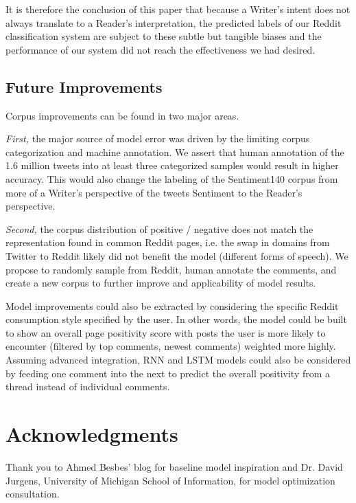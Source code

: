 \documentclass[11pt]{article}
\begin{document}
It is therefore the conclusion of this paper that because a Writer's intent does not always 
translate to a Reader's interpretation, the predicted labels of our Reddit classification 
system are subject to these subtle but tangible biases and the performance of our system 
did not reach the effectiveness we had desired.

\subsection{Future Improvements}

Corpus improvements can be found in two major areas. 

\textit{First,} the major source of model error was driven by the limiting corpus 
categorization and machine annotation. We assert that human annotation of the 1.6 
million tweets into at least three categorized samples would result in higher 
accuracy.  This would also change the labeling of the Sentiment140 corpus from more of 
a Writer's perspective of the tweets Sentiment to the Reader's perspective. 

\textit{Second,} the corpus distribution of positive / negative does not match the 
representation found in common Reddit pages, i.e. the swap in domains from Twitter to 
Reddit likely did not benefit the model (different forms of speech). We propose to 
randomly sample from Reddit, human annotate the comments, and create a new corpus to 
further improve and applicability of model results. 
\linebreak

Model improvements could also be extracted by considering the specific Reddit 
consumption style specified by the user. In other words, the model could be built to 
show an overall page positivity score with posts the user is more likely to encounter 
(filtered by top comments, newest comments) weighted more highly. Assuming advanced 
integration, RNN and LSTM models could also be considered by feeding one comment into 
the next to predict the overall positivity from a thread instead of individual 
comments. 

\section*{Acknowledgments}

Thank you to Ahmed Besbes' blog for baseline model inspiration 
and Dr. David Jurgens, University of Michigan School of Information, 
for model optimization consultation.
\end{document}
